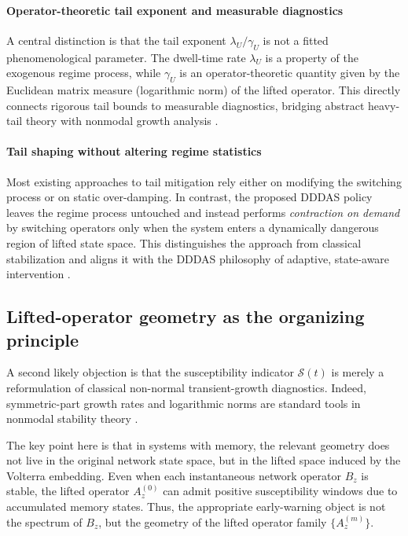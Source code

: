\documentclass[12pt,a4paper]{article}
\theoremstyle{definition}
\theoremstyle{remark}
\begin{document}
\paragraph{Operator-theoretic tail exponent and measurable diagnostics}
A central distinction is that the tail exponent $\lambda_U/\gamma_U$
is not a fitted phenomenological parameter.
The dwell-time rate $\lambda_U$ is a property of the exogenous regime process,
while $\gamma_U$ is an operator-theoretic quantity given by the Euclidean matrix measure
(logarithmic norm) of the lifted operator.
This directly connects rigorous tail bounds to measurable diagnostics,
bridging abstract heavy-tail theory
\cite{deSaporta2004tails,buraczewski2016}
with nonmodal growth analysis
\cite{trefethen1993,schmid2007,embree2005}.

\paragraph{Tail shaping without altering regime statistics}
Most existing approaches to tail mitigation rely either on modifying the switching process
or on static over-damping.
In contrast, the proposed DDDAS policy leaves the regime process untouched
and instead performs \emph{contraction on demand} by switching operators
only when the system enters a dynamically dangerous region of lifted state space.
This distinguishes the approach from classical stabilization
\cite{mao2007stochastic,yuan2010stability}
and aligns it with the DDDAS philosophy of adaptive, state-aware intervention
\cite{darema2004dddas,darema2009}.

\subsection*{Lifted-operator geometry as the organizing principle}

A second likely objection is that the susceptibility indicator $\mathcal S(t)$
is merely a reformulation of classical non-normal transient-growth diagnostics.
Indeed, symmetric-part growth rates and logarithmic norms are standard tools
in nonmodal stability theory
\cite{trefethen1993,schmid2007,embree2005}.

The key point here is that in systems with memory,
the relevant geometry does not live in the original network state space,
but in the lifted space induced by the Volterra embedding.
Even when each instantaneous network operator $B_z$ is stable,
the lifted operator $A_z^{(0)}$ can admit positive susceptibility windows
due to accumulated memory states.
Thus, the appropriate early-warning object is not the spectrum of $B_z$,
but the geometry of the lifted operator family $\{A_z^{(m)}\}$.
\end{document}
